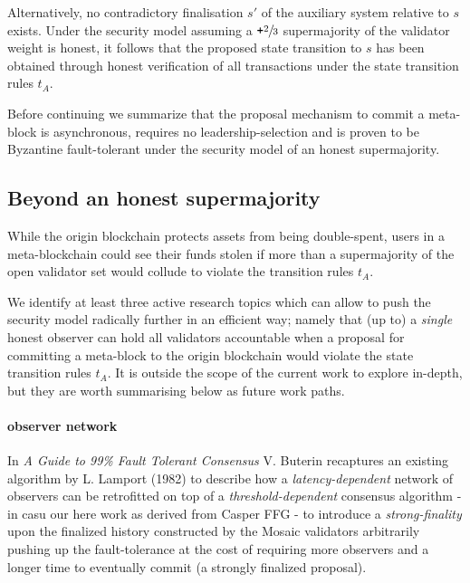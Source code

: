 \documentclass[12pt,a4paper]{article}
\begin{document}
Alternatively, no contradictory finalisation $s'$ of the auxiliary system relative to $s$ exists.
Under the security model assuming a $\texttt{+}\sfrac{2}{3}$ supermajority of the validator weight is honest, it follows that the proposed state transition to $s$ has been obtained through honest verification of all transactions under the state transition rules $t_A$.

Before continuing we summarize that the proposal mechanism to commit a meta-block is asynchronous, requires no leadership-selection and is proven to be Byzantine fault-tolerant under the security model of an honest supermajority.

\subsection{Beyond an honest supermajority}

While the origin blockchain protects assets from being double-spent, users in a meta-blockchain could see their funds stolen if more than a supermajority of the open validator set would collude to violate the transition rules $t_A$. 

We identify at least three active research topics which can allow to push the security model radically further in an efficient way; namely that (up to) a \emph{single} honest observer can hold all validators accountable when a proposal for committing a meta-block to the origin blockchain would violate the state transition rules $t_A$.
It is outside the scope of the current work to explore in-depth, but they are worth summarising below as future work paths.

\paragraph{observer network} In \textit{A Guide to 99\% Fault Tolerant Consensus}\cite{honestobserver} V. Buterin recaptures an existing algorithm by L. Lamport (1982) to describe how a \emph{latency-dependent} network of observers can be retrofitted on top of a \emph{threshold-dependent} consensus algorithm - in casu our here work as derived from Casper FFG - to introduce a \emph{strong-finality} upon the finalized history constructed by the Mosaic validators arbitrarily pushing up the fault-tolerance at the cost of requiring more observers and a longer time to eventually commit (a strongly finalized proposal).
\end{document}
